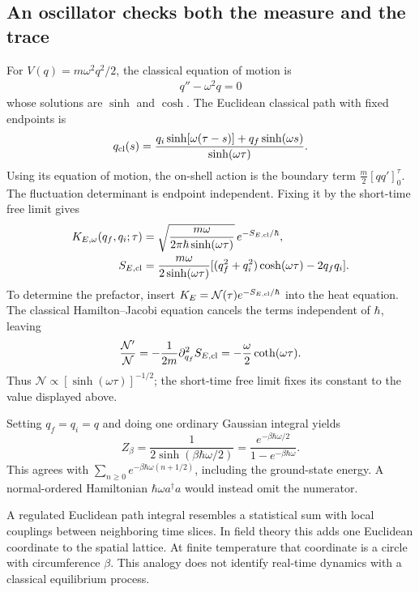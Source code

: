 \documentclass[11pt]{article}
\begin{document}
\subsection{An oscillator checks both the measure and the trace}
For \(V(q)=m\omega^2q^2/2\), the classical equation of motion is
\begin{align}
q''-\omega^2 q=0
\end{align}
whose solutions are $\sinh$ and $\cosh$. The Euclidean classical path with fixed
endpoints is
\begin{equation}
 q_{\rm cl}(s)=
 \frac{q_i\sinh[\omega(\tau-s)]+q_f\sinh(\omega s)}{\sinh(\omega\tau)}.
\end{equation}
Using its equation of motion, the on-shell action is the boundary
term \(\frac m2[qq']_0^\tau\). The fluctuation determinant is
endpoint independent. Fixing it by the short-time free limit gives
\begin{align}
 K_{E,\omega}(q_f,q_i;\tau)
 &=\sqrt{\frac{m\omega}{2\pi\hbar\sinh(\omega\tau)}}\,
 e^{-S_{E,\rm cl}/\hbar},\\
 S_{E,\rm cl}&=\frac{m\omega}{2\sinh(\omega\tau)}
 [(q_f^2+q_i^2)\cosh(\omega\tau)-2q_fq_i].
\end{align}
To determine the prefactor, insert \(K_E=\mathcal N(\tau)e^{-S_{E,\rm cl}/\hbar}\)
into the heat equation. The classical Hamilton--Jacobi equation cancels
the terms independent of \(\hbar\), leaving
\[
 \frac{\mathcal N'}{\mathcal N}
 =-\frac1{2m}\partial_{q_f}^2S_{E,\rm cl}
 =-\frac\omega2\coth(\omega\tau).
\]
Thus \(\mathcal N\propto[\sinh(\omega\tau)]^{-1/2}\); the short-time
free limit fixes its constant to the value displayed above.

Setting \(q_f=q_i=q\) and doing one ordinary Gaussian integral yields
\begin{equation}
 Z_\beta=\frac{1}{2\sinh(\beta\hbar\omega/2)}
 =\frac{e^{-\beta\hbar\omega/2}}{1-e^{-\beta\hbar\omega}}.
                                                        \label{eq:hoz}
\end{equation}
This agrees with \(\sum_{n\geq0}e^{-\beta\hbar\omega(n+1/2)}\),
including the ground-state energy. A normal-ordered Hamiltonian
\(\hbar\omega a^\dagger a\) would instead omit the numerator.

\begin{keyidea}
A regulated Euclidean path integral resembles a statistical sum with
local couplings between neighboring time slices. In field theory this
adds one Euclidean coordinate to the spatial lattice. At finite
temperature that coordinate is a circle with circumference $\beta$. This analogy does not identify real-time dynamics
with a classical equilibrium process.
\end{keyidea}
\end{document}
